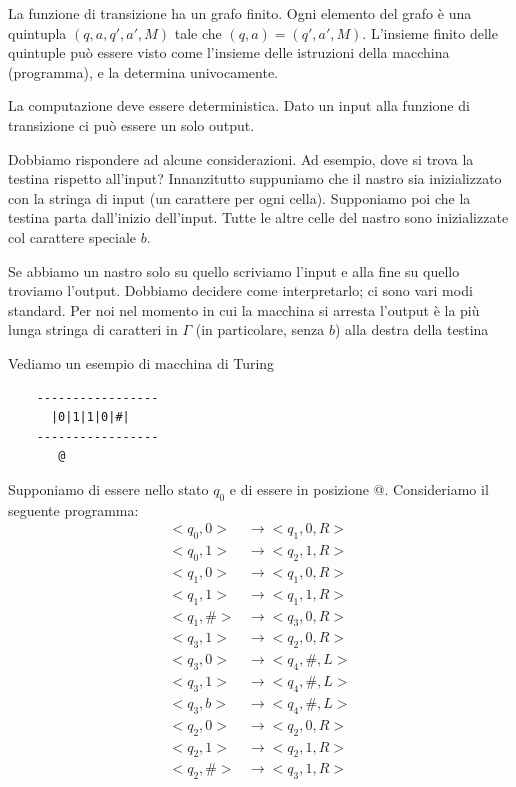 La funzione di transizione ha un grafo finito. Ogni elemento del grafo è una quintupla $(q, a, q',
a', M)$ tale che $(q, a) = (q', a', M)$. L'insieme finito delle quintuple può essere visto come
l'insieme delle istruzioni della macchina (programma), e la determina univocamente.

La computazione deve essere deterministica. Dato un input alla funzione di transizione ci può
essere un solo output.

Dobbiamo rispondere ad alcune considerazioni. Ad esempio, dove si trova la testina rispetto
all'input?  Innanzitutto suppuniamo che il nastro sia inizializzato con la stringa di input (un
carattere per ogni cella). Supponiamo poi che la testina parta dall'inizio dell'input. Tutte le
altre celle del nastro sono inizializzate col carattere speciale $b$.

Se abbiamo un nastro solo su quello scriviamo l'input e alla fine su quello troviamo l'output.
Dobbiamo decidere come interpretarlo; ci sono vari modi standard. Per noi nel momento in cui la
macchina si arresta l'output è la più lunga stringa di caratteri in $\Gamma$ (in particolare,
senza $b$) alla destra della testina

Vediamo un esempio di macchina di Turing 

\begin{verbatim}
    -----------------
      |0|1|1|0|#|
    -----------------
       @
\end{verbatim}

Supponiamo di essere nello stato $q_{0}$ e di essere in posizione @. Consideriamo il seguente programma:
\begin{align*}
    <q_{0},0> &\to <q_{1},0,R>\\
    <q_{0},1> &\to <q_{2},1,R>\\
    <q_{1},0> &\to <q_{1},0,R>\\
    <q_{1},1> &\to <q_{1},1,R>\\
    <q_{1},\#> &\to <q_{3},0,R>\\
    <q_{3},1> &\to <q_{2},0,R>\\
    <q_{3},0> &\to <q_{4},\#,L>\\
    <q_{3},1> &\to <q_{4},\#,L>\\
    <q_{3},b> &\to <q_{4},\#,L>\\
    <q_{2},0> &\to <q_{2},0,R>\\
    <q_{2},1> &\to <q_{2},1,R>\\
    <q_{2},\#> &\to <q_{3},1,R>
\end{align*}


